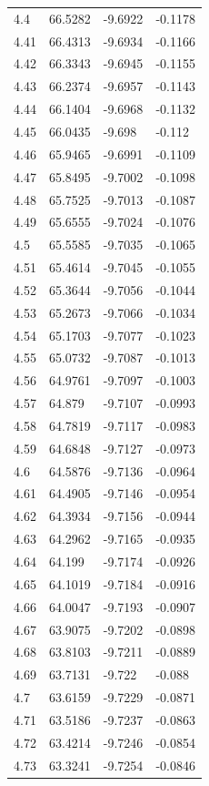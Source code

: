 \begin{tabular}{llll}
4.4 & 66.5282 & -9.6922 & -0.1178 \\
4.41 & 66.4313 & -9.6934 & -0.1166 \\
4.42 & 66.3343 & -9.6945 & -0.1155 \\
4.43 & 66.2374 & -9.6957 & -0.1143 \\
4.44 & 66.1404 & -9.6968 & -0.1132 \\
4.45 & 66.0435 & -9.698 & -0.112 \\
4.46 & 65.9465 & -9.6991 & -0.1109 \\
4.47 & 65.8495 & -9.7002 & -0.1098 \\
4.48 & 65.7525 & -9.7013 & -0.1087 \\
4.49 & 65.6555 & -9.7024 & -0.1076 \\
4.5 & 65.5585 & -9.7035 & -0.1065 \\
4.51 & 65.4614 & -9.7045 & -0.1055 \\
4.52 & 65.3644 & -9.7056 & -0.1044 \\
4.53 & 65.2673 & -9.7066 & -0.1034 \\
4.54 & 65.1703 & -9.7077 & -0.1023 \\
4.55 & 65.0732 & -9.7087 & -0.1013 \\
4.56 & 64.9761 & -9.7097 & -0.1003 \\
4.57 & 64.879 & -9.7107 & -0.0993 \\
4.58 & 64.7819 & -9.7117 & -0.0983 \\
4.59 & 64.6848 & -9.7127 & -0.0973 \\
4.6 & 64.5876 & -9.7136 & -0.0964 \\
4.61 & 64.4905 & -9.7146 & -0.0954 \\
4.62 & 64.3934 & -9.7156 & -0.0944 \\
4.63 & 64.2962 & -9.7165 & -0.0935 \\
4.64 & 64.199 & -9.7174 & -0.0926 \\
4.65 & 64.1019 & -9.7184 & -0.0916 \\
4.66 & 64.0047 & -9.7193 & -0.0907 \\
4.67 & 63.9075 & -9.7202 & -0.0898 \\
4.68 & 63.8103 & -9.7211 & -0.0889 \\
4.69 & 63.7131 & -9.722 & -0.088 \\
4.7 & 63.6159 & -9.7229 & -0.0871 \\
4.71 & 63.5186 & -9.7237 & -0.0863 \\
4.72 & 63.4214 & -9.7246 & -0.0854 \\
4.73 & 63.3241 & -9.7254 & -0.0846 \\

\end{tabular}
